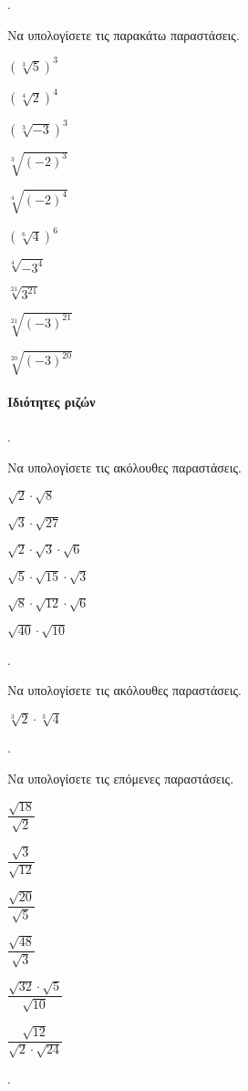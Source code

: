 \documentclass[11pt,a4paper,twocolumn]{article}
\newcounter{askhsh}
\newcommand{\askhsh}{\large\theaskhsh.\ \addtocounter{askhsh}{1}}
\begin{document}
\askhsh Να υπολογίσετε τις παρακάτω παραστάσεις.
\begin{multicols}{3}
\begin{alist}
\item $\left(\sqrt[3]{5}\right)^3$
\item $\left(\sqrt[4]{2}\right)^4$
\item $\left(\sqrt[3]{-3}\right)^3$
\item $\sqrt[3]{(-2)^3}$
\item $\sqrt[4]{(-2)^4}$
\item $\left(\sqrt[6]{4}\right)^6$
\item $\sqrt[4]{-3^4}$
\item $\sqrt[21]{3^{21}}$
\item $\sqrt[21]{(-3)^{21}}$
\item $\sqrt[20]{(-3)^{20}}$
\end{alist}
\end{multicols}
\paragraph{Ιδιότητες ριζών}
\askhsh Να υπολογίσετε τις ακόλουθες παραστάσεις.
\begin{multicols}{2}
\begin{alist}
\item $\sqrt{2}\cdot\sqrt{8}$
\item $\sqrt{3}\cdot\sqrt{27}$
\item $\sqrt{2}\cdot\sqrt{3}\cdot\sqrt{6}$
\item $\sqrt{5}\cdot\sqrt{15}\cdot\sqrt{3}$
\item $\sqrt{8}\cdot\sqrt{12}\cdot\sqrt{6}$
\item $\sqrt{40}\cdot\sqrt{10}$
\end{alist}
\end{multicols}

\askhsh Να υπολογίσετε τις ακόλουθες παραστάσεις.
\begin{multicols}{2}
\begin{alist}
\item $\sqrt[3]{2}\cdot\sqrt[3]{4}$
\end{alist}
\end{multicols}

\askhsh Να υπολογίσετε τις επόμενες παραστάσεις.
\begin{multicols}{3}
\begin{alist}
\item $\dfrac{\sqrt{18}}{\sqrt{2}}$
\item $\dfrac{\sqrt{3}}{\sqrt{12}}$
\item $\dfrac{\sqrt{20}}{\sqrt{5}}$
\item $\dfrac{\sqrt{48}}{\sqrt{3}}$
\item $\dfrac{\sqrt{32}\cdot\sqrt{5}}{\sqrt{10}}$
\item $\dfrac{\sqrt{12}}{\sqrt{2}\cdot\sqrt{24}}$
\end{alist}
\end{multicols}
\askhsh
\end{document}
